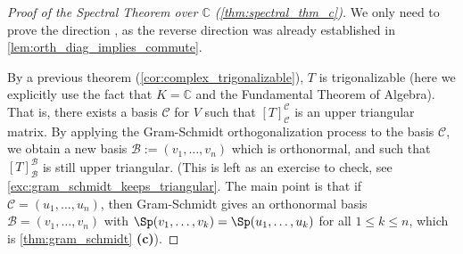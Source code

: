 \begin{proof}[Proof of the Spectral Theorem over $\mathbb{C}$ (\cref{thm:spectral_thm_c})]
We only need to prove the direction , as the reverse direction was already established in \cref{lem:orth_diag_implies_commute}.

By a previous theorem (\cref{cor:complex_trigonalizable}), $T$ is trigonalizable (here we explicitly use the fact that $K = \mathbb{C}$ and the Fundamental Theorem of Algebra). That is, there exists a basis $\mathcal{C}$ for $V$ such that $[T]_{\mathcal{C}}^{\mathcal{C}}$ is an upper triangular matrix.
By applying the Gram-Schmidt orthogonalization process to the basis $\mathcal{C}$, we obtain a new basis $\mathcal{B} := (v_1, \dots, v_n)$ which is orthonormal, and such that $[T]_{\mathcal{B}}^{\mathcal{B}}$ is still upper triangular. (This is left as an exercise to check, see \cref{exc:gram_schmidt_keeps_triangular}. The main point is that if $\mathcal{C} = (u_1, \dots, u_n)$, then Gram-Schmidt gives an orthonormal basis $\mathcal{B} = (v_1, \dots, v_n)$ with $\Sp(v_1, \dots, v_k) = \Sp(u_1, \dots, u_k)$ for all $1 \leq k \leq n$, which is \cref{thm:gram_schmidt} \textbf{(c)}).


\end{proof}

